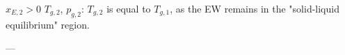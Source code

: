 \( x_{E,2} > 0 \)  
\( T_{g,2} \), \( p_{g,2} \):  
\( T_{g,2} \) is equal to \( T_{g,1} \), as the EW remains in the "solid-liquid equilibrium" region.  

---